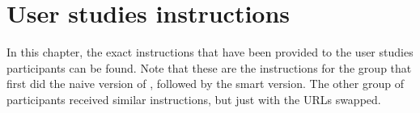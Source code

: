 \chapter{User studies instructions}

In this chapter, the exact instructions that have been provided to the user studies participants can be found. Note that these are the instructions for the group that first did the naive version of \oframp, followed by the smart version. The other group of participants received similar instructions, but just with the URLs swapped.


\begin{comment}
\section{Invitation}
Dear all,

As you may have heard, Gunnar Klau, Mohammed El-Kebir, and I have been working on a tool for fragment-based molecule parameterisation. Using this tool, you should be able to approximate the charges of the atoms in a molecule, based on fragments of other molecules. I am glad to announce that the initial version of the tool, called OFraMP, has been completed and is ready to be tested.

For me, developing the system has been part of my graduation project of the Master Software Engineering at the University of Amsterdam. As this is a software engineering project, it is, for me, mainly aimed at finding the best way to interact with a tool for fragment-based molecule parameterisation, and less at implementing a system that is only providing chemically correct solutions (although I tried to do my best, and I think it should at least make some sense).

In order to find out what a good way of interacting with this kind of system would be, I had to develop two different versions of it. These two versions need to be compared using a user study. I would like to ask you to please take part in this experiment, which will cost you approximately one hour. I do realise that this may be quite long, but the outcome of the studies will not only help me finish my Master's project; it will also be most valuable for further development of the system, and should help you learning how to use it (in case you wish to use the system in the future).

As there are different versions of the system, there are also different variants of the user studies. Every one of you will get a follow-up email shortly, containing your personal instructions.


\end{comment}
